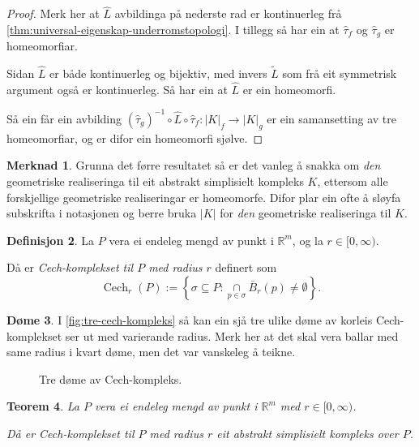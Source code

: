\documentclass[a4paper, 12pt, norsk]{article}
\theoremstyle{plain}
\newtheorem{theorem}{Teorem}[section]
\theoremstyle{definition}
\newtheorem{definition}[theorem]{Definisjon}
\newtheorem{example}[theorem]{Døme}
\newtheorem{remark}[theorem]{Merknad}
\newcommand{\Rb}{\mathbb{R}}
\newcommand{\intersect}{ \mathop{\cap}\limits }
\newcommand{\gr}[1]{ \lvert #1 \rvert } %
\DeclareMathOperator{\Cech}{Cech} %
\begin{document}
\begin{proof}
	Merk her at \( \hat{L} \) avbildinga på nederste rad er kontinuerleg frå \autoref{thm:universal-eigenskap-underromstopologi}. I tillegg så har ein at \( \hat{\tau}_f \) og \( \hat{\tau}_g \) er homeomorfiar.

	Sidan $\hat{L}$ er både kontinuerleg og bijektiv, med invers $\tilde{L}$ som frå eit symmetrisk argument også er kontinuerleg. Så har ein at $\hat{L}$ er ein homeomorfi.

	Så ein får ein avbilding $(\hat{\tau}_g)^{-1}\circ\hat{L}\circ\hat{\tau}_f:\gr{K}_f\to\gr{K}_g$ er ein samansetting av tre homeomorfiar, og er difor ein homeomorfi sjølve.
\end{proof}

\begin{remark}
	Grunna det førre resultatet så er det vanleg å snakka om \emph{den} geometriske realiseringa til eit abstrakt simplisielt kompleks $K$, ettersom alle forskjellige geometriske realiseringar er homeomorfe. Difor plar ein ofte å sløyfa subskrifta i notasjonen og berre bruka $\gr{K}$ for \emph{den} geometriske realiseringa til $K$.
\end{remark}

\begin{definition}
	La \( P \) vera ei endeleg mengd av punkt i \( \Rb^m \), og la \( r \in [0, \infty) \).
	
	Då er \emph{Cech-komplekset til $P$ med radius $r$} definert som
	\[
		\Cech_r(P) := \left\{\sigma\subseteq P : \intersect_{p\in\sigma}\bar{B}_r(p)\neq\emptyset\right\}.
	\]
\end{definition}

\begin{example}
	 I \autoref{fig:tre-cech-kompleks} så kan ein sjå tre ulike døme av korleis Cech-komplekset ser ut med varierande radius. Merk her at det skal vera ballar med same radius i kvart døme, men det var vanskeleg å teikne.
	\begin{figure}[htbp]
		\begin{center}
			
		\end{center}
		\caption{Tre døme av Cech-kompleks.}
		\label{fig:tre-cech-kompleks}
	\end{figure}
\end{example}

\begin{theorem} \label{thm:CASK}
	La \( P \) vera ei endeleg mengd av punkt i \( \Rb^m \) med \( r \in [0, \infty) \).
	
	Då er Cech-komplekset til $P$ med radius $r$ eit abstrakt simplisielt kompleks over $P$.
\end{theorem}
\end{document}
